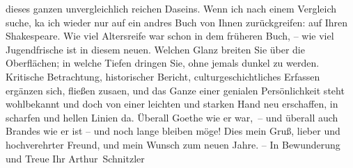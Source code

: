 \begin{ledgroupsized}[t]{13cm}
                        dieses ganzen unvergleichlich reichen Daseins. Wenn ich nach einem Vergleich
                        suche, ka{\geminationn} ich wieder nur auf ein andres
                        Buch von Ihnen zurückgreifen: auf Ihren Shakespeare. Wie viel Altersreife
                        war schon in dem früheren Buch, – wie viel Jugendfrische \introOben{}ist\introOben{} in diesem neuen. Welchen Glanz breiten Sie über
                        die Oberflächen; in welche Tiefen dringen Sie, ohne jemals dunkel zu werden.
                        {\pb}Kritische Betrachtung,
                        historischer Bericht, culturgeschichtliches Erfassen ergänzen sich, fließen
                        zusa{\geminationm}en, und das Ganze einer genialen
                        Persönlichkeit steht wohlbekannt und doch von einer leichten und starken
                        Hand neu erschaffen, in scharfen und hellen Linien da. Überall Goethe wie er
                        war, – und überall auch Brandes wie er ist – und noch lange bleiben möge!
                        Dies mein Gruß, lieber und hochverehrter Freund, und mein Wunsch zum neuen
                        Jahre. – In Bewunderung und Treue\pend
           \pstart Ihr \spacefill\mbox{Arthur Schnitzler}\pend{}\endnumbering{}\end{ledgroupsized}  \newcommand{\dateiname}{L02372}\newcommand{\titel}{Arthur Schnitzler an Georg Brandes, 28. 12. 1921}\newcommand{\editorInnen}{Martin Anton Müller und Gerd-Hermann Susen}
      